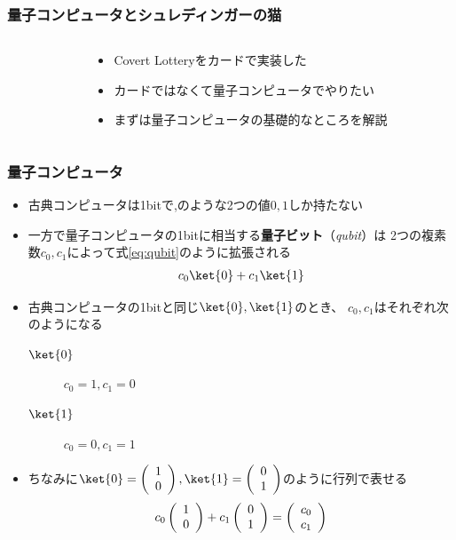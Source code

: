 \begin{frame}
  \frametitle{量子コンピュータとシュレディンガーの猫}

  \begin{columns}
    \begin{column}{0.55\textwidth}
      \begin{minipage}[t][.6\textheight][t]{\textwidth}
        \tableofcontents[currentsection]
      \end{minipage}
    \end{column}
    \begin{column}{0.45\textwidth}
      \pause
      \begin{itemize}
        \item<+-> Covert Lotteryをカードで実装した
        
        \item<+-> カードではなくて量子コンピュータでやりたい

        \item<+-> まずは量子コンピュータの基礎的なところを解説
      \end{itemize}
    \end{column}
  \end{columns}
\end{frame}

\begin{frame}
  \frametitle{量子コンピュータ}

  \pause
  \begin{itemize}
    \item<+-> 古典コンピュータは1bitで\heartcard,\clubcard のような2つの値$0,1$しか持たない

    \item<+-> 一方で量子コンピュータの1bitに相当する\textbf{量子ビット}（\emph{qubit}）は
    2つの複素数$c_0, c_1$によって式\ref{eq:qubit}のように拡張される
    \begin{align}
      c_0\ket{0} + c_1\ket{1} \label{eq:qubit}
    \end{align}

    \item<+-> 古典コンピュータの1bitと同じ$\ket{0}, \ket{1}$のとき、
    $c_0, c_1$はそれぞれ次のようになる
    \begin{description}
      \item[$\ket{0}$] $c_0 = 1, c_1 = 0$
      \item[$\ket{1}$] $c_0 = 0, c_1 = 1$
    \end{description}

    \item<+-> ちなみに$\ket{0} = \Zero, \ket{1} = \One$のように行列で表せる
    \[
      c_0\left( \begin{array}{c} 1 \\ 0 \end{array} \right) + c_1\left( \begin{array}{c} 0 \\ 1 \end{array} \right) = \left(
        \begin{array}{c}
          c_0 \\
          c_1
        \end{array}
      \right)
    \]
  \end{itemize}
\end{frame}

